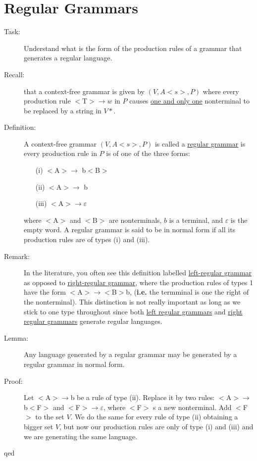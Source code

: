 \documentclass[10pt]{article}
\begin{document}
	\section{Regular Grammars}
	\begin{description}
		\item[Task:] Understand what is the form of the production rules of a grammar that generates a regular language.
		\item[Recall:] that a context-free grammar is given by $(V, A {<}s{>}, P)$ where every production rule $<$T$> \rightarrow w$ in $P$ causes \underline{one and only one} nonterminal to be replaced by a string in $V*$.
		\item[Definition:] A context-free grammar $(V, A {<}s{>}, P)$ is called a \underline{regular grammar} is every production rule in $P$ is of one of the three forms:
		\begin{enumerate}
			\item[(i)] $<$A$> \rightarrow$ b$<$B$>$
			\item[(ii)] $<$A$> \rightarrow$ b
			\item[(iii)] $<$A$> \rightarrow \varepsilon$
		\end{enumerate}
		where $<$A$>$ and $<$B$>$ are nonterminals, $b$ is a terminal, and $\varepsilon$ is the empty word. A regular grammar is said to be in normal form if all its production rules are of types (i) and (iii).
		\item[Remark:] In the literature, you often see this definition labelled \underline{left-regular grammar} as opposed to \underline{right-regular grammar}, where the production rules of types 1 have the form $<$A$> \rightarrow <$B$>$b, (\textbf{i.e.} the termminal is one the right of the nonterminal). This distinction is not really important as long as we stick to one type throughout since both \underline{left regular grammars} and \underline{right regular grammars} generate regular languages.
		\item[Lemma:] Any language generated by a regular grammar may be generated by a regular grammar in normal form.
		\item[Proof:] Let $<$A$> \rightarrow$b be a rule of type (ii). Replace it by two rules: $<$A$> \rightarrow$b$<$F$>$ and $<$F$> \rightarrow \varepsilon$, where $<$F$>$ s a new nonterminal. Add $<$F$>$ to the set $V$. We do the same for every rule of type (ii) obtaining a bigger set $V$, but now our production rules are only of type (i) and (iii) and we are generating the same language.
		\item[qed]

\end{description}
\end{document}
